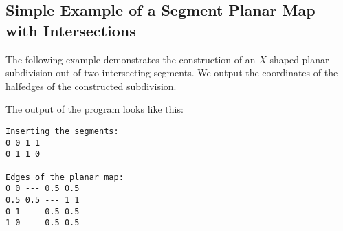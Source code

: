 
\subsection{Simple Example of a Segment Planar Map with Intersections}
\label{ssec:example1}
The following example demonstrates the construction of an
$X$-shaped planar subdivision out of two intersecting segments.
We output the coordinates of the halfedges of the constructed
subdivision.


The output of the program looks like this:
\begin{verbatim}
Inserting the segments:
0 0 1 1
0 1 1 0

Edges of the planar map:
0 0 --- 0.5 0.5
0.5 0.5 --- 1 1
0 1 --- 0.5 0.5
1 0 --- 0.5 0.5
\end{verbatim}








